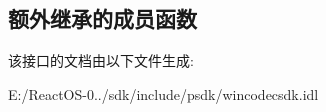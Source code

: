 \subsection*{额外继承的成员函数}


该接口的文档由以下文件生成\+:\begin{DoxyCompactItemize}
\item 
E\+:/\+React\+O\+S-\/0../sdk/include/psdk/wincodecsdk.\+idl\end{DoxyCompactItemize}
